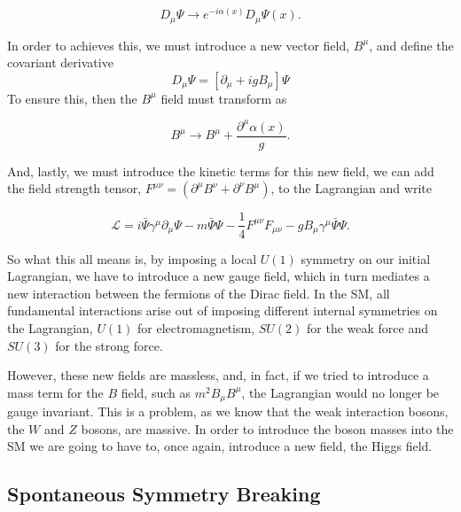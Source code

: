 \documentclass[EPJ,twocolumn]{webofc}
\begin{document}
\begin{equation}
    D_{\mu}\Psi \rightarrow e^{-i\alpha(x)}D_{\mu}\Psi(x).
\end{equation}

In order to achieves this, we must introduce a new vector field, $B^{\mu}$, and define the covariant derivative
\begin{equation}
    D_{\mu}\Psi = \left[\partial_{\mu}+igB_{\mu} \right]\Psi
    \label{CovariantDeriv}
\end{equation}
To ensure this, then the $B^{\mu}$ field must transform as

\begin{equation}
    B^{\mu} \rightarrow B^{\mu} + \frac{\partial^{\mu}\alpha(x)}{g}.
\end{equation}

And, lastly, we must introduce the kinetic terms for this new field, we can add the field strength tensor, $F^{\mu\nu} = \left( \partial^{\mu}B^{\nu}+ \partial^{\nu}B^{\mu} \right)$, to the Lagrangian and write

\begin{equation}
    \mathcal{L} = i\bar{\Psi}\gamma^{\mu}\partial_{\mu}\Psi -m\bar{\Psi}\Psi-\frac{1}{4}F^{\mu\nu}F_{\mu\nu}-gB_{\mu}\gamma^{\mu}\bar{\Psi}\Psi.
\end{equation}

So what this all means is, by imposing a local $U(1)$ symmetry on our initial Lagrangian, we have to introduce a new gauge field, which in turn mediates a new interaction between the fermions of the Dirac field. In the SM, all fundamental interactions arise out of imposing different internal symmetries on the Lagrangian, $U(1)$ for electromagnetism, $SU(2)$ for the weak force and $SU(3)$ for the strong force. 

However, these new fields are massless, and, in fact, if we tried to introduce a mass term for the $B$ field, such as $m^2B_{\mu}B^{\mu}$, the Lagrangian would no longer be gauge invariant. This is a problem, as we know that the weak interaction bosons, the $W$ and $Z$ bosons, are massive. In order to introduce the boson masses into the SM we are going to have to, once again, introduce a new field, the Higgs field.


\subsection*{Spontaneous Symmetry Breaking}
\end{document}
